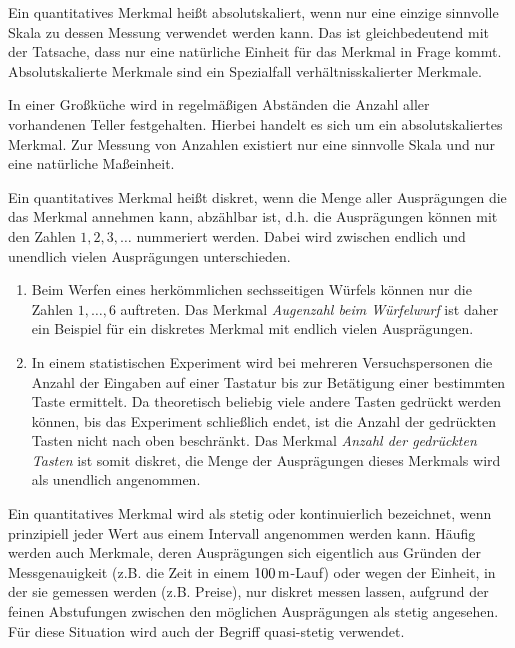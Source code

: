 \documentclass{lecture}
\begin{document}
    Ein quantitatives Merkmal heißt absolutskaliert, wenn nur eine einzige sinnvolle Skala zu dessen Messung verwendet werden kann.
    Das ist gleichbedeutend mit der Tatsache, dass nur eine natürliche Einheit für das Merkmal in Frage kommt.
    Absolutskalierte Merkmale sind ein Spezialfall verhältnisskalierter Merkmale.

    \begin{example}
        In einer Großküche wird in regelmäßigen Abständen die Anzahl aller vorhandenen Teller festgehalten.
        Hierbei handelt es sich um ein absolutskaliertes Merkmal.
        Zur Messung von Anzahlen existiert nur eine sinnvolle Skala und nur eine natürliche Maßeinheit.
    \end{example}

    Ein quantitatives Merkmal heißt diskret, wenn die Menge aller Ausprägungen die das Merkmal annehmen kann, abzählbar ist, d.h. die Ausprägungen können mit den Zahlen \(1, 2, 3, \ldots\) nummeriert werden.
    Dabei wird zwischen endlich und unendlich vielen Ausprägungen unterschieden.

    \begin{example}
        \begin{enumerate}
            \item Beim Werfen eines herkömmlichen sechsseitigen Würfels können nur die Zahlen \(1, \ldots, 6\) auftreten.
            Das Merkmal \emph{Augenzahl beim Würfelwurf} ist daher ein Beispiel für ein diskretes Merkmal mit endlich vielen Ausprägungen.
            \item In einem statistischen Experiment wird bei mehreren Versuchspersonen die Anzahl der Eingaben auf einer Tastatur bis zur Betätigung einer bestimmten Taste ermittelt.
            Da theoretisch beliebig viele andere Tasten gedrückt werden können, bis das Experiment schließlich endet, ist die Anzahl der gedrückten Tasten nicht nach oben beschränkt.
            Das Merkmal \emph{Anzahl der gedrückten Tasten} ist somit diskret, die Menge der Ausprägungen dieses Merkmals wird als unendlich angenommen.
        \end{enumerate}
    \end{example}

    Ein quantitatives Merkmal wird als stetig oder kontinuierlich bezeichnet, wenn prinzipiell jeder Wert aus einem Intervall angenommen werden kann.
    Häufig werden auch Merkmale, deren Ausprägungen sich eigentlich aus Gründen der Messgenauigkeit (z.B. die Zeit in einem \(100\,\si{\meter}\)-Lauf) oder wegen der Einheit, in der sie gemessen werden (z.B. Preise), nur diskret messen lassen, aufgrund der feinen Abstufungen zwischen den möglichen Ausprägungen als stetig angesehen.
    Für diese Situation wird auch der Begriff quasi-stetig verwendet.
\end{document}
